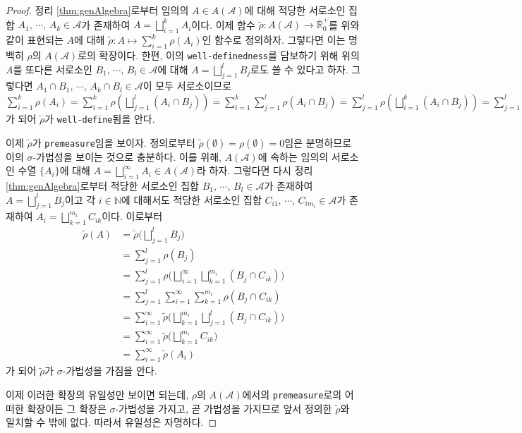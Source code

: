 \begin{proof}
    정리 \ref{thm:genAlgebra}로부터 임의의 $A\in A(\mathcal{A})$에 대해 적당한 서로소인 집합 $A_1,\,\cdots,\,A_k\in\mathcal{A}$가 존재하여 $A=\bigsqcup_{i=1}^kA_i$이다. 이제 함수 $\widetilde{\rho}:A(\mathcal{A})\to\overline{\mathbb{R}}^+_0$를 위와 같이 표현되는 $A$에 대해 $\widetilde{\rho}:A\mapsto\sum_{i=1}^k\rho(A_i)$인 함수로 정의하자. 그렇다면 이는 명백히 $\rho$의 $A(\mathcal{A})$로의 확장이다. 한편, 이의 \texttt{well-definedness}를 담보하기 위해 위의 $A$를 또다른 서로소인 $B_1,\,\cdots,\,B_l\in\mathcal{A}$에 대해 $A=\bigsqcup_{j=1}^lB_j$로도 쓸 수 있다고 하자. 그렇다면 $A_1\cap B_1,\,\cdots,\,A_k\cap B_l\in\mathcal{A}$이 모두 서로소이므로 $\sum_{i=1}^k\rho(A_i)=\sum_{i=1}^k\rho(\bigsqcup_{j=1}^l(A_i\cap B_j))=\sum_{i=1}^k\sum_{j=1}^l\rho(A_i\cap B_j)=\sum_{j=1}^l\rho(\bigsqcup_{i=1}^k(A_i\cap B_j))=\sum_{j=1}^l\rho(B_j)$가 되어 $\widetilde{\rho}$가 \texttt{well-define}됨을 안다.

    이제 $\widetilde{\rho}$가 \texttt{premeasure}임을 보이자. 정의로부터 $\widetilde{\rho}(\emptyset)=\rho(\emptyset)=0$임은 분명하므로 이의 $\sigma$-가법성을 보이는 것으로 충분하다. 이를 위해, $A(\mathcal{A})$에 속하는 임의의 서로소인 수열 $\{A_i\}$에 대해 $A=\bigsqcup_{i=1}^\infty A_i\in A(\mathcal{A})$라 하자. 그렇다면 다시 정리 \ref{thm:genAlgebra}로부터 적당한 서로소인 집합 $B_1,\,\cdots,\,B_l\in\mathcal{A}$가 존재하여 $A=\bigsqcup_{j=1}^lB_j$이고 각 $i\in\mathbb{N}$에 대해서도 적당한 서로소인 집합 $C_{i1},\,\cdots,\,C_{im_i}\in\mathcal{A}$가 존재하여 $A_i=\bigsqcup_{k=1}^{m_i}C_{ik}$이다. 이로부터
    \begin{align*}
        \widetilde{\rho}(A)&=\widetilde{\rho}\bigg(\bigsqcup_{j=1}^lB_j\bigg)\\
        &=\sum_{j=1}^l\rho(B_j)\\
        &=\sum_{j=1}^l\rho\bigg(\bigsqcup_{i=1}^\infty\bigsqcup_{k=1}^{m_i}(B_j\cap C_{ik})\bigg)\\
        &=\sum_{j=1}^l\sum_{i=1}^\infty\sum_{k=1}^{m_i}\rho(B_j\cap C_{ik})\\
        &=\sum_{i=1}^\infty\widetilde{\rho}\bigg(\bigsqcup_{k=1}^{m_i}\bigsqcup_{j=1}^l(B_j\cap C_{ik})\bigg)\\
        &=\sum_{i=1}^\infty\widetilde{\rho}\bigg(\bigsqcup_{k=1}^{m_i}C_{ik}\bigg)\\
        &=\sum_{i=1}^\infty\widetilde{\rho}(A_i)
    \end{align*}
    가 되어 $\widetilde{\rho}$가 $\sigma$-가법성을 가짐을 안다.

    이제 이러한 확장의 유일성만 보이면 되는데,  $\rho$의 $A(\mathcal{A})$에서의 \texttt{premeasure}로의 어떠한 확장이든 그 확장은 $\sigma$-가법성을 가지고, 곧 가법성을 가지므로 앞서 정의한  $\widetilde{\rho}$와 일치할 수 밖에 없다. 따라서 유일성은 자명하다.
\end{proof}

